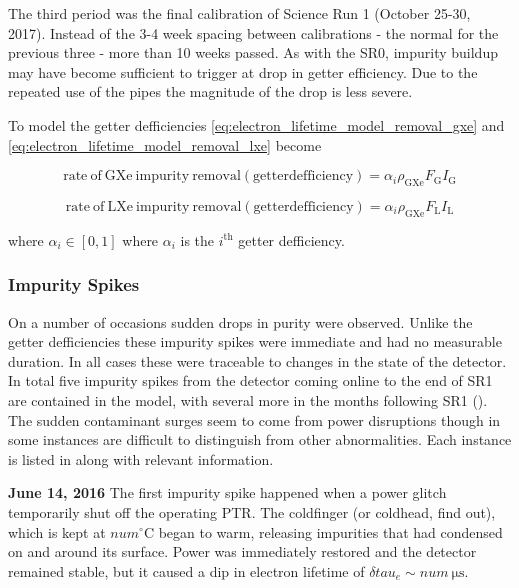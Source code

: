 {The third period was the final \rncal calibration of Science Run 1 (October 25-30, 2017).  Instead of the 3-4 week spacing between
calibrations - the normal for the previous three - more than 10 weeks passed.  As with the SR0, impurity buildup may have become
sufficient to trigger at drop in getter efficiency.  Due to the repeated use of the pipes the magnitude of the drop is less severe.

To model the getter defficiencies \eqref{eq:electron_lifetime_model_removal_gxe} and \eqref{eq:electron_lifetime_model_removal_lxe}
become

\begin{equation}
\mathrm{rate\ of\ GXe\ impurity\ removal (getter defficiency)} = \alpha_i \rho_{\mathrm{GXe}} F_{\mathrm{G}} I_{\mathrm{G}}
\end{equation}

\begin{equation}
\mathrm{rate\ of\ LXe\ impurity\ removal (getter defficiency)} = \alpha_i \rho_{\mathrm{GXe}} F_{\mathrm{L}} I_{\mathrm{L}}
\end{equation}

\noindent where $\alpha_i \in [0, 1]$ where $\alpha_i$ is the $i^{\mathrm{th}}$ getter defficiency.



\subsubsection{Impurity Spikes}
\label{subsubsec:electron_lifetime_model_detector_effects_spikes}
On a number of occasions sudden drops in purity were observed.  Unlike the getter defficiencies these impurity spikes were immediate and
had no measurable duration.  In all cases these were traceable to changes in the state of the detector.  In total five impurity spikes
from the detector coming online to the end of SR1 are contained in the model, with several more in the months following SR1
(\secref{}).  The
sudden contaminant surges seem to come from power disruptions though in some instances are difficult to distinguish from other
abnormalities.  Each instance is listed in  along with relevant
information.

\textbf{June 14, 2016}  The first impurity spike happened when a power glitch temporarily shut off the operating PTR.  The coldfinger (or
coldhead, find out), which is kept at $num^{\circ} \mathrm{C}$ began to warm, releasing impurities that had condensed on and around its
surface.  Power was immediately restored and the detector remained stable, but it caused a dip in electron lifetime of
$\delta tau_e \sim num\ \mathrm{\mu s}$.

}

